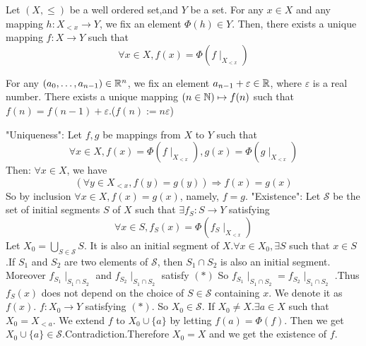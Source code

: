 \documentclass{book}
\numberwithin{equation}{section}
\begin{document}
\begin{theoremenv}
    Let $(X,\le)$ be a well ordered set,and $Y$ be a set. For any $x\in X$ and any mapping $h:X_{<x}\rightarrow Y$, we fix an element $\Phi(h)\in Y$. Then, there exists a unique mapping $f:X\rightarrow Y$  such that 
    $$\forall x\in X, f(x)=\Phi(f\mid_{X_{<x}})$$
\end{theoremenv}
\begin{exampleenv}
    For any $(a_0,\dots,a_{n-1})\in \mathbb{R}^n$, we fix an element $a_{n-1}+\varepsilon\in \mathbb{R}$, where $\varepsilon$ is a real number. There exists a unique mapping $(n\in \mathbb{N})\mapsto f(n)$ such that $f(n)=f(n-1)+\varepsilon$.($f(n):=n\varepsilon$)
\end{exampleenv}
\begin{proofenv}
    \quad
    \newline
    "Uniqueness": 
    \newline
    Let $f,g$ be mappings from $X$ to $Y$ such that 
    $$\forall x\in X,f(x)=\Phi(f\mid_{X_{<x}}),g(x)=\Phi(g\mid_{X_{<x}})$$
    Then: $\forall x\in X$, we have 
    $$(\forall y\in X_{<x},f(y)=g(y))\Rightarrow f(x)=g(x)$$
    So by inclusion $\forall x \in X, f(x)=g(x)$, namely, $f=g$.
    \newline
    "Existence": 
    \newline
    Let $\mathscr{S}$  be the set of initial segments $S$ of $X$ such that $\exists f_S:S\rightarrow Y$ satisfying 
    \begin{equation*}
        \forall x\in S,f_S(x)=\Phi(f_S\mid_{X_{<x}}) \tag{$*$}
    \end{equation*}
    Let $X_0=\bigcup_{S\in\mathscr{S} }S$. It is also an initial segment of $X$.$\forall x\in X_0,\exists S $ such that $x\in S$.If $S_1$ and $S_2$ are two elements of $\mathscr{S}$, then $S_1\cap S_2$ is also an initial segment. Moreover $f_{S_1}\mid_{S_1\cap S_2}$ and $f_{S_2}\mid_{S_1\cap S_2}$ satisfy $(*)$ So $f_{S_1}\mid_{S_1\cap S_2}=f_{S_2}\mid_{S_1\cap S_2}$ .Thus $f_S(x)$ does not depend on the choice of $S\in \mathscr{S}$ containing $x$. We denote it as $f(x)$. $f:X_0\rightarrow Y$ satisfying $(*)$. So $X_0\in \mathscr{S}$.
    If $X_0\not=X.\exists a\in X$ such that $ X_0=X_{<a}$. We extend $f$ to $X_0\cup\{a\}$ by letting $f(a)=\Phi(f)$. Then we get $X_0\cup\{a\}\in \mathscr{S}$.Contradiction.Therefore $X_0=X$  and we get the existence of $f$. 
\end{proofenv}
\end{document}
